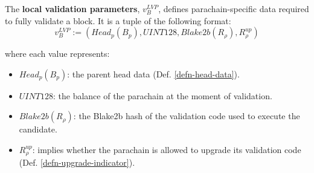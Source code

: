 \begin{definition}
  \label{defn-local-validation-parameters}
  The \textbf{local validation parameters}, $v^{LVP}_B$, defines parachain-specific
  data required to fully validate a block. It is a tuple of the following format:
  \[
    v^{LVP}_B := (Head_p(B_p), UINT128, Blake2b(R_{\rho}), R^{up}_{\rho})
  \]

  where each value represents:
  \begin{itemize}
    \item $Head_p(B_p)$: the parent head data (Def. \ref{defn-head-data}).
    \item $UINT128$: the balance of the parachain at the moment of validation.
    \item $Blake2b(R_{\rho})$: the Blake2b hash of the validation code used to
    execute the candidate.
    \item $R^{up}_{\rho}$: implies whether the parachain is allowed to upgrade
    its validation code (Def. \ref{defn-upgrade-indicator}).
  \end{itemize}
\end{definition}

